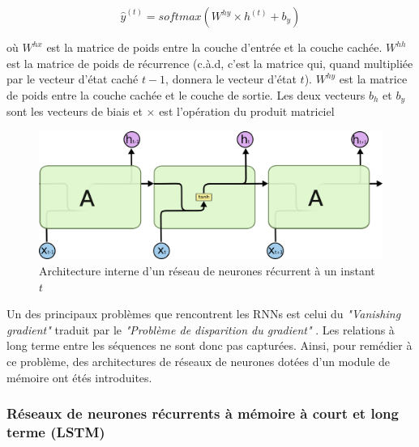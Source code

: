 \begin{equation}
\hat{y}^{(t)} = softmax(W^{hy} \times h^{(t)} + b_y)
\end{equation}

où $W^{hx}$ est la matrice de poids entre la couche d'entrée et la couche cachée. $W^{hh}$ est la matrice de poids de récurrence (c.à.d, c'est la matrice qui, quand multipliée par le vecteur d'état caché $t-1$, donnera le vecteur d'état $t$). $W^{hy}$ est la matrice de poids entre la couche cachée et le couche de sortie. Les deux vecteurs $b_h$ et $b_y$ sont les vecteurs de biais et $\times$ est l'opération du produit matriciel \citep{rnn_lstms}

\begin{figure}[h]
	\centering
	
	\includegraphics[width=0.5\linewidth]{images/notions/rnns_unrolled_online.png}
	\caption{Architecture interne d'un réseau de neurones récurrent à un instant $t$ \citep{rnns_online}}
\end{figure}
\par 
Un des principaux problèmes que rencontrent les RNNs est celui du \textit{"Vanishing gradient"} traduit par le \textit{"Problème de disparition du gradient"} \citep{vanishing_gradient}. Les relations à long terme entre les séquences ne sont donc pas capturées. Ainsi, pour remédier à ce problème, des architectures de réseaux de neurones dotées d'un module de mémoire ont étés introduites.

\subsubsection*{Réseaux de neurones récurrents à mémoire à court et long terme (LSTM)}

